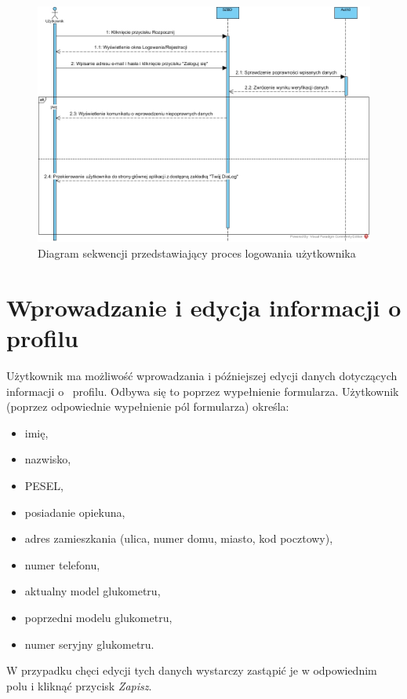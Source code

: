 \begin{figure}[h]
	\centering\includegraphics[scale=0.4]{images/sequence_login.jpg}
	\caption{Diagram sekwencji przedstawiający proces logowania użytkownika}
	\label{Rys:login}
\end{figure}

\section{Wprowadzanie i edycja informacji o profilu}
Użytkownik ma możliwość wprowadzania i późniejszej edycji danych dotyczących informacji o~ profilu. Odbywa się to poprzez wypełnienie formularza. Użytkownik (poprzez odpowiednie wypełnienie pól formularza) określa: 
\begin{itemize}
	\item imię,
	\item nazwisko,
	\item PESEL,
	\item posiadanie opiekuna,
	\item adres zamieszkania (ulica, numer domu, miasto, kod pocztowy),
	\item numer telefonu,
	\item aktualny model glukometru,
	\item poprzedni modelu glukometru,
	\item numer seryjny glukometru.
\end{itemize}
W przypadku chęci edycji tych danych wystarczy zastąpić je w odpowiednim polu i kliknąć przycisk \textit{Zapisz}.

